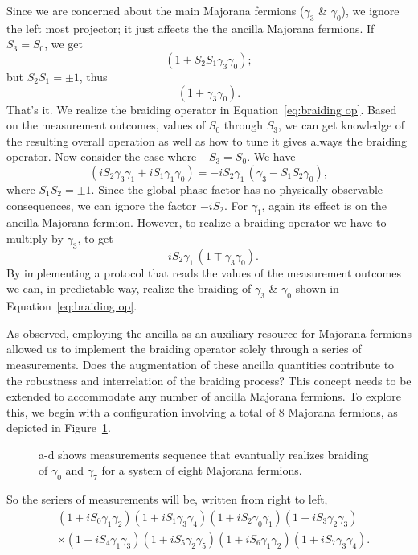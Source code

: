 \documentclass{article}
\begin{document}
Since we are concerned about the main Majorana fermions ($ \gamma_3 $ \& $ \gamma_0 $), we ignore the left most projector; it just affects the the ancilla Majorana fermions.
If $ S_3 = S_0 $, we get
\[
	( 1 + S_2 S_1 \gamma_3 \gamma_0 );
\]
but $ S_2 S_1 = \pm 1 $, thus
\[
	( 1 \pm \gamma_3 \gamma_0 ).
\]
That's it. We realize the braiding operator in Equation~\ref{eq:braiding op}. Based on the measurement outcomes, values of $ S_0 $ through $ S_3 $, we can get knowledge of the resulting overall operation as well as how to tune it gives always the braiding operator. Now consider the case where $ -S_3 = S_0 $. We have
\[
	( iS_2 \gamma_3 \gamma_1 +iS_1 \gamma_1 \gamma_0)
	= -i S_2 \gamma_1\, ( \gamma_3 - S_1 S_2 \gamma_0) ,
\]
where $ S_1 S_2 = \pm 1 $. Since the global phase factor has no physically observable consequences, we can ignore the factor $ -iS_2 $. For $ \gamma_1 $, again its effect is on the ancilla Majorana fermion. However, to realize a braiding operator we have to multiply by $ \gamma_3 $, to get
\[
	-iS_2 \gamma_1\, (1 \mp \gamma_3 \gamma_0).
\]
By implementing a protocol that reads the values of the measurement outcomes we can, in predictable way, realize the braiding of $ \gamma_3 $ \& $ \gamma_0 $ shown in Equation~\ref{eq:braiding op}.

\vspace{12pt}
As observed, employing the ancilla as an auxiliary resource for Majorana fermions allowed us to implement the braiding operator solely through a series of measurements. Does the augmentation of these ancilla quantities contribute to the robustness and interrelation of the braiding process? This concept needs to be extended to accommodate any number of ancilla Majorana fermions. To explore this, we begin with a configuration involving a total of 8 Majorana fermions, as depicted in Figure~\ref{fig:8-conf-meas}.
\begin{figure}
	\begin{center}
		
	\end{center}
	\caption{a-d shows measurements sequence that evantually realizes braiding of $ \gamma_0 $ and $ \gamma_7 $ for a system of eight Majorana fermions.}
	\label{fig:8-conf-meas}
\end{figure}
So the seriers of measurements will be, written from right to left,
\begin{equation}
	\begin{aligned}
		 & (1+ i S_0 \gamma_1 \gamma_2)(1+ i S_1 \gamma_3 \gamma_4)(1+ i S_2 \gamma_0 \gamma_1) (1+ i S_3 \gamma_2 \gamma_3)         \\
		 & \times (1+ i S_4 \gamma_1 \gamma_3)(1+ i S_5 \gamma_2 \gamma_5)(1+ i S_6 \gamma_1 \gamma_2)(1+ i S_7 \gamma_3 \gamma_4) .
	\end{aligned}
	\label{eq:meas seq 8 mfs}
\end{equation}
\end{document}
